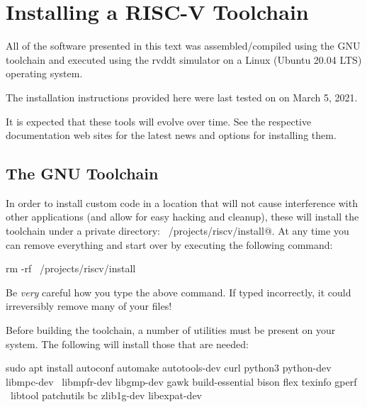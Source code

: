 \chapter{Installing a RISC-V Toolchain}
\label{chapter:install}

All of the software presented in this text was assembled/compiled
using the GNU toolchain and executed using the rvddt simulator on
a Linux (Ubuntu 20.04 LTS) operating system.

The installation instructions provided here were last tested on
on March 5, 2021.

It is expected that these tools will evolve over time.  See the
respective documentation web sites for the latest news and options
for installing them.

\section{The GNU Toolchain}

%
In order to install custom code in a location that will not cause
interference with other applications (and allow for easy hacking and
cleanup), these will install the toolchain under
a private directory: \verb@~/projects/riscv/install@.  At any time
you can remove everything and start over by executing the following
command:

\begin{tty}
rm -rf ~/projects/riscv/install
\end{tty}

\begin{tcolorbox}
Be {\em very} careful how you type the above \verb@rm@ command.
If typed incorrectly, it could irreversibly remove many of your files!
\end{tcolorbox}

Before building the toolchain, a number of utilities must be present on
your system.  The following will install those that are needed:

\begin{minipage}{\textwidth}
\begin{tty}
sudo apt install autoconf automake autotools-dev curl python3 python-dev libmpc-dev \
    libmpfr-dev libgmp-dev gawk build-essential bison flex texinfo gperf \
    libtool patchutils bc zlib1g-dev libexpat-dev
\end{tty}
\end{minipage}

